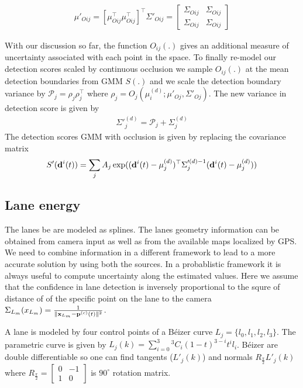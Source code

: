 \documentclass[10pt,twocolumn,letterpaper]{article}
\begin{document}
\begin{align}
  \mu'_{Oij} = [\mu_{Oij}^\top \mu_{Oij}^\top]^\top
  \Sigma'_{Oij} = \begin{bmatrix}
    \Sigma_{Oij} & \Sigma_{Oij} \\
\Sigma_{Oij} & \Sigma_{Oij}
  \end{bmatrix}
\end{align}

With our
discussion so far, the function $O_{ij}(.)$ gives an additional measure of
uncertainty associated with each point in the space. To finally re-model our
detection scores scaled by continuous occlusion we sample $O_{ij}(.)$ at the
mean detection boundaries from GMM $S(.)$ and we scale the detection boundary
variance by $\mathcal{P}_{j} = \rho_{j}\rho_{j}^\top$ where $\rho_{j} =
O_{j}(\mu^{(d)}_i; \mu'_{Oj}, \Sigma'_{Oj})$. The new variance
in detection score is given by 
%
\begin{align}
  \Sigma'^{(d)}_j = \mathcal{P}_{j}
  + \Sigma^{(d)}_j
\end{align}
%
The detection scores GMM with occlusion is given by replacing the covariance
matrix
\begin{align}
  S'(\mathbf{d}^{i}(t)) = \sum_j A_j \exp((\mathbf{d}^{i}(t)-\mu^{(d)}_j)^\top \Sigma'^{(d)-1}_j
  (\mathbf{d}^{i}(t)-\mu^{(d)}_j))
\end{align}

\newcommand{\Beizer}{B\'eizer }
\subsection{Lane energy}
\label{sec:laneEnergy}
 The lanes be are modeled as splines. The lanes geometry information can be
 obtained from camera input as well as from the available maps localized by
 GPS. We need to combine information in a different framework to lead to a
more accurate solution by using both the sources. In a probablistic framework
it is always useful to compute uncertainty along the estimated values.
Here we assume that the confidence in lane detection is inversely proportional
to the squre of distance of of the specific point on the lane to the camera
\newcommand{\LaneUncertainty}[1]{\Sigma_{L_m}(#1)}
$\Sigma_{L_m}({x}_{L_m}) = \frac{1}{\|\mathbf{x}_{L_m} - \mathbf{p}^{(c)}(t)\|^2}$.

A lane is modeled by four control points of a \Beizer curve $L_j = \{l_0, l_1,
l_2, l_3\}$. The parametric curve is given by $L_j(k) = \sum_{i=0}^3 {}^3C_i
(1-t)^{3-i}t^i l_i$. \Beizer are double differentiable so one can find
tangents ($L'_j(k)$) and normals $R_{\frac{\pi}{2}}L'_j(k)$ where 
$R_{\frac{\pi}{2}} = \begin{bmatrix} 0 & -1 \\ 1 & 0 \end{bmatrix}$ is
$90^\circ$ rotation matrix.
\end{document}
